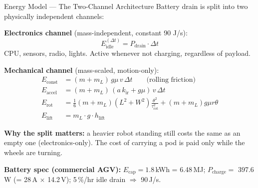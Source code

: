 \documentclass[aspectratio=169,10pt]{beamer}
\begin{document}
\begin{frame}{Energy Model --- The Two-Channel Architecture}
  \footnotesize
  Battery drain is split into two physically independent channels:

  \vspace{0.4em}
  \textbf{Electronics channel} (mass-independent, constant 90 J/s):
  \[
    E_\text{idle}^{(\Delta t)} = P_\text{drain} \cdot \Delta t
  \]
  CPU, sensors, radio, lights. Active whenever not charging, regardless of payload.

  \vspace{0.4em}
  \textbf{Mechanical channel} (mass-scaled, motion-only):
  \begin{align*}
    E_\text{const} &= (m + m_L)\, g\mu\, v\, \Delta t \qquad\text{(rolling friction)} \\
    E_\text{accel} &= (m + m_L)\,(a\, k_\text{ir} + g\mu)\, v\, \Delta t \\
    E_\text{rot}   &= \tfrac{1}{6}(m+m_L)(L^2+W^2) \tfrac{\theta^2}{\tau_\text{rot}^2} + (m+m_L)g\mu r \theta \\
    E_\text{lift}  &= m_L \cdot g \cdot h_\text{lift}
  \end{align*}

  \vspace{0.3em}
  \textbf{Why the split matters:} a heavier robot standing still costs the same as an empty one (electronics-only). The cost of carrying a pod is paid only while the wheels are turning.

  \vspace{0.3em}
  \textbf{Battery spec (commercial AGV):} $E_\text{cap} = 1.8$\,kWh = 6.48\,MJ; $P_\text{charge} = $ 397.6\,W (= 28\,A $\times$ 14.2\,V); 5\,\%/hr idle drain $\Rightarrow$ 90\,J/s.
\end{frame}
\end{document}
